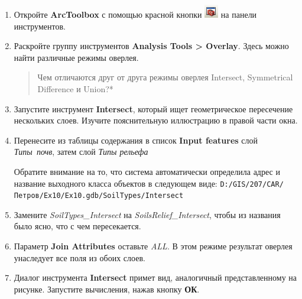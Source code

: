 \documentclass[]{book}
\theoremstyle{definition}
\theoremstyle{definition}
\theoremstyle{definition}
\theoremstyle{remark}
\begin{document}
\begin{enumerate}
\def\labelenumi{\arabic{enumi}.}
\item
  Откройте \textbf{ArcToolbox} с помощью красной кнопки
  \includegraphics{images/Ex10/image8.png} на панели инструментов.
\item
  Раскройте группу инструментов \textbf{Analysis Tools \textgreater{}
  Overlay}. Здесь можно найти различные режимы оверлея.

  \begin{quote}
  Чем отличаются друг от друга режимы оверлея Intersect, Symmetrical
  Difference и Union?*
  \end{quote}
\item
  Запустите инструмент \textbf{Intersect}, который ищет геометрическое
  пересечение нескольких слоев. Изучите пояснительную иллюстрацию в
  правой части окна.
\item
  Перенесите из таблицы содержания в список \textbf{Input features} слой
  \emph{Типы~почв}, затем слой \emph{Типы рельефа}

  Обратите внимание на то, что система автоматически определила адрес и
  название выходного класса объектов в следующем виде:
  \texttt{D:/GIS/207/CAR/Петров/Ex10/Ex10.gdb/SoilTypes/Intersect}
\item
  Замените \emph{SoilTypes\_Intersect} на \emph{SoilsRelief\_Intersect},
  чтобы из названия было ясно, что с чем пересекается.
\item
  Параметр \textbf{Join Attributes} оставьте \emph{ALL}. В этом режиме
  результат оверлея унаследует все поля из обоих слоев.
\item
  Диалог инструмента \textbf{Intersect} примет вид, аналогичный
  представленному на рисунке. Запустите вычисления, нажав кнопку
  \textbf{ОК}.


\end{enumerate}
\end{document}
